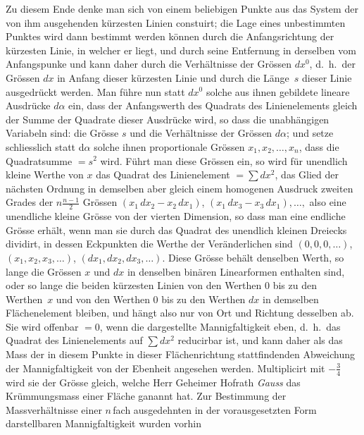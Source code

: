 \documentclass[a4paper,12pt]{article}
\begin{document}
Zu diesem Ende denke man sich von einem beliebigen Punkte aus das
System der von ihm ausgehenden k\"{u}rzesten Linien constuirt;
die Lage eines unbestimmten Punktes wird dann bestimmt werden
k\"{o}nnen durch die Anfangsrichtung der k\"{u}rzesten Linie, in
welcher er liegt, und durch seine Entfernung in derselben vom
Anfangspunke und kann daher durch die Verh\"{a}ltnisse der
Gr\"{o}ssen $dx^0$, d.~h.\ der Gr\"{o}ssen $dx$ in Anfang dieser
k\"{u}rzesten Linie und durch die L\"{a}nge~$s$ dieser Linie
ausgedr\"{u}ckt werden.  Man f\"{u}hre nun statt $dx^0$ solche
aus ihnen gebildete lineare Ausdr\"{u}cke $d\alpha$ ein, dass der
Anfangswerth des Quadrats des Linienelements gleich der Summe der
Quadrate dieser Ausdr\"{u}cke wird, so dass die unabh\"{a}ngigen
Variabeln sind: die Gr\"{o}sse $s$ und die Verh\"{a}ltnisse der
Gr\"{o}ssen $d\alpha$; und setze schliesslich statt d$\alpha$
solche ihnen proportionale Gr\"{o}ssen $x_1, x_2,\ldots, x_n$,
dass die Quadratsumme $= s^2$ wird.  F\"{u}hrt man diese
Gr\"{o}ssen ein, so wird f\"{u}r unendlich kleine Werthe von $x$
das Quadrat des Linienelement $= \sum dx^2$, das Glied der
n\"{a}chsten Ordnung in demselben aber gleich einem homogenen
Ausdruck zweiten Grades der
$\displaystyle n \frac{n-1}{2}$
Gr\"{o}ssen
$(x_1 \, dx_2 - x_2 \, dx_1)$,
$(x_1 \, dx_3 - x_3 \,dx_1),\ldots,$
also eine unendliche kleine Gr\"{o}sse von der vierten Dimension,
so dass man eine endliche Gr\"{o}sse erh\"{a}lt, wenn man sie
durch das Quadrat des unendlich kleinen Dreiecks dividirt, in
dessen Eckpunkten die Werthe der Ver\"{a}nderlichen sind
$(0,0,0,\ldots)$,
$(x_1, x_2, x_3,\ldots)$,
$(dx_1, dx_2, dx_3,\ldots)$.
Diese Gr\"{o}sse beh\"{a}lt denselben Werth, so lange die
Gr\"{o}ssen $x$ und $dx$ in denselben bin\"{a}ren Linearformen
enthalten sind, oder so lange die beiden k\"{u}rzesten Linien von
den Werthen $0$ bis zu den Werthen~$x$ und von den Werthen $0$
bis zu den Werthen $dx$ in demselben Fl\"{a}chenelement bleiben,
und h\"{a}ngt also nur von Ort und Richtung desselben ab.  Sie
wird offenbar $= 0$, wenn die dargestellte Mannigfaltigkeit eben,
d.~h.\ das Quadrat des Linienelements auf $\sum dx^2$ reducirbar
ist, und kann daher als das Mass der in diesem Punkte in dieser
Fl\"{a}chenrichtung stattfindenden Abweichung der
Mannigfaltigkeit von der Ebenheit angesehen werden.  Multiplicirt
mit $-\frac{3}{4}$ wird sie der Gr\"{o}sse gleich, welche Herr
Geheimer Hofrath \emph{Gauss} das Kr\"{u}mmungsmass einer
Fl\"{a}che ganannt hat.  Zur Bestimmung der Massverh\"{a}ltnisse
einer $n \,$\-fach ausgedehnten in der vorausgesetzten Form
darstellbaren Mannigfaltigkeit wurden vorhin
\end{document}

